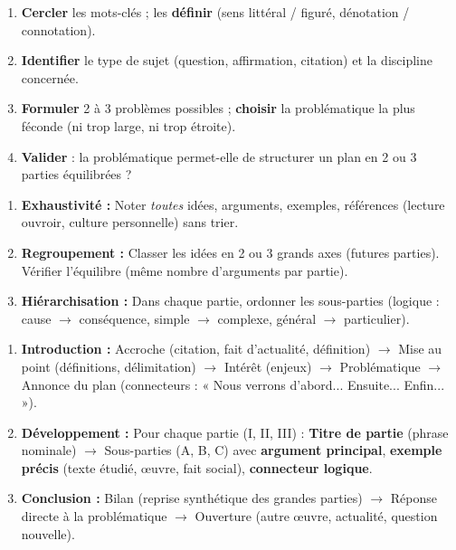 \documentclass[11pt]{article}
\newcommand{\cle}[1]{{\popxbold\color{popdark}#1}}
\newcounter{popsec}
\newcounter{popsub}
\newcommand{\courssub}[1]{%
  \stepcounter{popsub}%
  \par\vspace{9pt}\noindent{\popxbold\fontsize{11.5}{13}\selectfont\color{popink}{\color{poporange}\thepopsec.\thepopsub}\hspace{6pt}#1}\par\nopagebreak\vspace{4pt}
}
\begin{document}
\courssub{Méthodes express (à mémoriser)}

\begin{methode}
\begin{enumerate}
    \item \textbf{Cercler} les mots-clés ; les \textbf{définir} (sens littéral / figuré, dénotation / connotation).
    \item \textbf{Identifier} le type de sujet (question, affirmation, citation) et la discipline concernée.
    \item \textbf{Formuler} 2 à 3 problèmes possibles ; \textbf{choisir} la problématique la plus féconde (ni trop large, ni trop étroite).
    \item \textbf{Valider} : la problématique permet-elle de structurer un plan en 2 ou 3 parties équilibrées ?
\end{enumerate}
\end{methode}

\begin{methode}
\begin{enumerate}
    \item \textbf{Exhaustivité :} Noter \emph{toutes} idées, arguments, exemples, références (lecture ouvroir, culture personnelle) sans trier.
    \item \textbf{Regroupement :} Classer les idées en 2 ou 3 \cle{grands axes} (futures parties). Vérifier l'équilibre (même nombre d'arguments par partie).
    \item \textbf{Hiérarchisation :} Dans chaque partie, ordonner les sous-parties (logique : cause $\to$ conséquence, simple $\to$ complexe, général $\to$ particulier).
\end{enumerate}
\end{methode}

\begin{methode}
\begin{enumerate}
    \item \textbf{Introduction :} \cle{Accroche} (citation, fait d'actualité, définition) $\to$ \cle{Mise au point} (définitions, délimitation) $\to$ \cle{Intérêt} (enjeux) $\to$ \cle{Problématique} $\to$ \cle{Annonce du plan} (connecteurs : « Nous verrons d'abord... Ensuite... Enfin... »).
    \item \textbf{Développement :} Pour chaque partie (I, II, III) : \textbf{Titre de partie} (phrase nominale) $\to$ Sous-parties (A, B, C) avec \textbf{argument principal}, \textbf{exemple précis} (texte étudié, œuvre, fait social), \textbf{connecteur logique}.
    \item \textbf{Conclusion :} \cle{Bilan} (reprise synthétique des grandes parties) $\to$ \cle{Réponse directe} à la problématique $\to$ \cle{Ouverture} (autre œuvre, actualité, question nouvelle).
\end{enumerate}
\end{methode}
\end{document}
